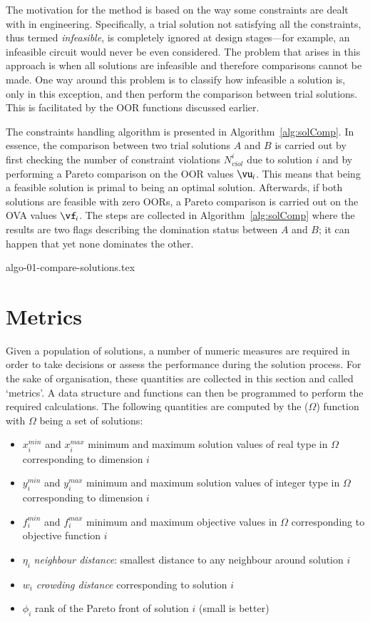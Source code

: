 \documentclass[final,5p,times,twocolumn]{elsarticle}
\begin{document}
The motivation for the method is based on the way some constraints are dealt with in engineering.
Specifically, a trial solution not satisfying all the constraints, thus termed \emph{infeasible}, is
completely ignored at design stages---for example, an infeasible circuit would never be even
considered. The problem that arises in this approach is when all solutions are infeasible and
therefore comparisons cannot be made. One way around this problem is to classify how infeasible a
solution is, only in this exception, and then perform the comparison between trial solutions. This
is facilitated by the OOR functions discussed earlier.

The constraints handling algorithm is presented in Algorithm~\ref{alg:solComp}. In essence, the
comparison between two trial solutions $A$ and $B$ is carried out by first checking the number of
constraint violations $N_{viol}^i$ due to solution $i$ and by performing a Pareto comparison on the
OOR values $\vu_i$. This means that being a feasible solution is primal to being an optimal
solution. Afterwards, if both solutions are feasible with zero OORs, a Pareto comparison is carried
out on the OVA values $\vf_i$. The steps are collected in Algorithm~\ref{alg:solComp} where the
results are two flags describing the domination status between $A$ and $B$; it can happen that yet
none dominates the other.


{algo-01-compare-solutions.tex}



\section{Metrics}
\label{sec:metrics}

Given a population of solutions, a number of numeric measures are required in order to take
decisions or assess the performance during the solution process. For the sake of organisation, these
quantities are collected in this section and called `metrics'. A data structure and functions can
then be programmed to perform the required calculations. The following quantities are computed by
the \FnMetrics($\Omega$) function with $\Omega$ being a set of solutions:
\begin{itemize}
    \item $x^{min}_i$ and $x^{max}_i$ minimum and maximum solution values of real type
          in $\Omega$ corresponding to dimension $i$
    \item $y^{min}_i$ and $y^{max}_i$ minimum and maximum solution values of integer type
          in $\Omega$ corresponding to dimension $i$
    \item $f^{min}_i$ and $f^{max}_i$ minimum and maximum objective values in $\Omega$
          corresponding to objective function $i$
    \item $\eta_{i}$ \emph{neighbour distance}: smallest distance to any neighbour around
          solution $i$
    \item $w_i$ \emph{crowding distance} corresponding to solution $i$
    \item $\phi_i$ rank of the Pareto front of solution $i$ (small is better)
\end{itemize}
\end{document}
